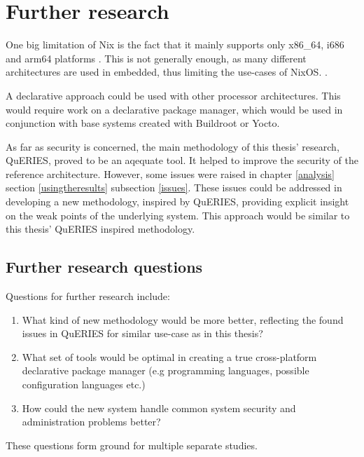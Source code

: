 \chapter{Further research} \label{further}

One big limitation of Nix is the fact that it mainly supports only
x86\_64, i686 and arm64 platforms \cite{nixosNixOSManual}. This is not
generally enough, as many different architectures are used in
embedded, thus limiting the use-cases of
NixOS. \cite{fysarakis2014embedded}.

A declarative approach could be used with other processor
architectures. This would require work on a declarative package
manager, which would be used in conjunction with base systems created
with Buildroot or Yocto.

As far as security is concerned, the main methodology of this thesis'
research, QuERIES, proved to be an aqequate tool. It helped to improve
the security of the reference architecture. However, some issues were
raised in chapter \ref{analysis} section \ref{usingtheresults}
subsection \ref{issues}. These issues could be addressed in developing
a new methodology, inspired by QuERIES, providing explicit insight on
the weak points of the underlying system. This approach would be
similar to this thesis' QuERIES inspired methodology.

\section{Further research questions}


Questions for further research include:
\begin{enumerate}
  \item{What kind of new methodology would be more better, reflecting
    the found issues in QuERIES for similar use-case as in this
    thesis?}
  \item What set of tools would be optimal in creating a true
    cross-platform declarative package manager (e.g programming
    languages, possible configuration languages etc.)
      
    \item How could the new system handle common system security and
      administration problems better?
      
\end{enumerate}

These questions form ground for multiple separate studies.

